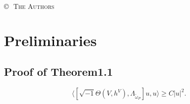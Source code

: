 \documentclass[twoside,openany,12pt]{beautynote}
\date{\today\vfill\texttt{[image: titlepage.png]}\\[.1em] \textsc{\large Beautynote}}
\author{Ethan Lu}
\begin{document}
\maketitle\clearpage
\copyrights
\pagestyle{\auxsettings}
\makeatletter
\thispagestyle{copyright}
\ifdefempty{\@faculty}{}{\noindent{\large\textsc{\@faculty}} \\}
\ifdefempty{\@university}{}{{\large\textsc{\@university}} \\[1em]}
\vfill
{}
\copyright\,\the\year\, \textsc{The Authors}
\doclicenseThis
\cleardoublepage
\makeatother
    \tableofcontents
\pagestyle{\defaultsettings}
\chapter{Preliminaries}
\section{Proof of Theorem1.1}
\newcommand{\tmop}[1]{\ensuremath{\operatorname{#1}}}
\begin{lemma}[3.3]
    \[ \langle \left[ \sqrt{- 1} \Theta (V, h^V), \Lambda_{\tilde{\omega}_P}
    \right] u, u \rangle \geqslant C | u |^2 . \]
\end{lemma}
\end{document}
